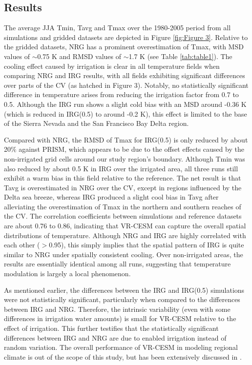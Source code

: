 \documentclass[draft,ms]{agutex}   %
\begin{document}
\begin{article}
\section{Results}

The average JJA Tmin, Tavg and Tmax over the 1980-2005 period from all simulations and gridded datasets are depicted in Figure \ref{fig:Figure 3}. Relative to the gridded datasets, NRG has a prominent overestimation of Tmax, with MSD values of $\sim$0.75 K and RMSD values of $\sim$1.7 K (see Table \ref{tab:table1}). The cooling effect caused by irrigation is clear in all temperature fields when comparing NRG and IRG results, with all fields exhibiting significant differences over parts of the CV (as hatched in Figure 3). Notably, no statistically significant difference in temperature arises from reducing the irrigation factor from 0.7 to 0.5. Although the IRG run shows a slight cold bias with an MSD around -0.36 K (which is reduced in IRG(0.5) to around -0.2 K), this effect is limited to the base of the Sierra Nevada and the San Francisco Bay Delta region.

Compared with NRG, the RMSD of Tmax for IRG(0.5) is only reduced by about 20$\%$ against PRISM, which appears to be due to the offset effects caused by the non-irrigated grid cells around our study region's boundary. Although Tmin was also reduced by about 0.5 K in IRG over the irrigated area, all three runs still exhibit a warm bias in this field relative to the reference. The net result is that Tavg is overestimated in NRG over the CV, except in regions influenced by the Delta sea breeze, whereas IRG produced a slight cool bias in Tavg after alleviating the overestimation of Tmax in the northern and southern reaches of the CV. The correlation coefficients between simulations and reference datasets are about 0.76 to 0.86, indicating that VR-CESM can capture the overall spatial distributions of temperature. Although NRG and IRG are highly correlated with each other ($>$0.95), this simply implies that the spatial pattern of IRG is quite similar to NRG under spatially consistent cooling. Over non-irrigated areas, the results are essentially identical among all runs, suggesting that temperature modulation is largely a local phenomenon.

As mentioned earlier, the differences between the IRG and IRG(0.5) simulations were not statistically significant, particularly when compared to the differences between IRG and NRG. Therefore, the intrinsic variability (even with some differences in irrigation water amounts) is small for VR-CESM relative to the effect of irrigation. This further testifies that the statistically significant differences between IRG and NRG are due to enabled irrigation instead of random variation. The overall performance of VR-CESM in modeling regional climate is out of the scope of this study, but has been extensively discussed in \citep{huang2016evaluation}.


\end{article}
\end{document}
